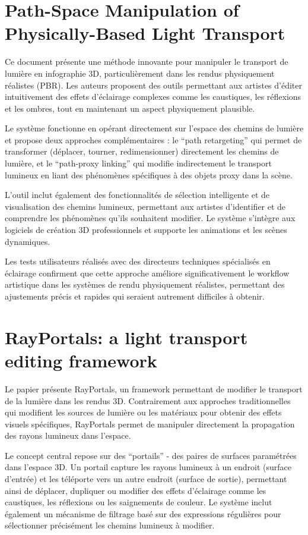 \documentclass{article}
\begin{document}
\section{Path-Space Manipulation of Physically-Based Light Transport}
Ce document présente une méthode innovante pour manipuler le transport de lumière en infographie 3D, particulièrement dans les rendus physiquement réalistes (PBR). Les auteurs proposent des outils permettant aux artistes d'éditer intuitivement des effets d'éclairage complexes comme les caustiques, les réflexions et les ombres, tout en maintenant un aspect physiquement plausible.

Le système fonctionne en opérant directement sur l'espace des chemins de lumière et propose deux approches complémentaires : le ``path retargeting'' qui permet de transformer (déplacer, tourner, redimensionner) directement les chemins de lumière, et le ``path-proxy linking'' qui modifie indirectement le transport lumineux en liant des phénomènes spécifiques à des objets proxy dans la scène. 

L'outil inclut également des fonctionnalités de sélection intelligente et de visualisation des chemins lumineux, permettant aux artistes d'identifier et de comprendre les phénomènes qu'ils souhaitent modifier. Le système s'intègre aux logiciels de création 3D professionnels et supporte les animations et les scènes dynamiques.

Les tests utilisateurs réalisés avec des directeurs techniques spécialisés en éclairage confirment que cette approche améliore significativement le workflow artistique dans les systèmes de rendu physiquement réalistes, permettant des ajustements précis et rapides qui seraient autrement difficiles à obtenir.

\section{RayPortals: a light transport editing framework}
Le papier présente RayPortals, un framework permettant de modifier le transport de la lumière dans les rendus 3D. Contrairement aux approches traditionnelles qui modifient les sources de lumière ou les matériaux pour obtenir des effets visuels spécifiques, RayPortals permet de manipuler directement la propagation des rayons lumineux dans l'espace.

Le concept central repose sur des ``portails'' - des paires de surfaces paramétrées dans l'espace 3D. Un portail capture les rayons lumineux à un endroit (surface d'entrée) et les téléporte vers un autre endroit (surface de sortie), permettant ainsi de déplacer, dupliquer ou modifier des effets d'éclairage comme les caustiques, les réflexions ou les saignements de couleur. Le système inclut également un mécanisme de filtrage basé sur des expressions régulières pour sélectionner précisément les chemins lumineux à modifier.
\end{document}
